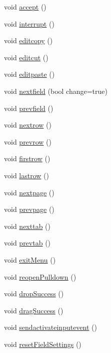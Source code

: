 \begin{DoxyCompactItemize}
\item 
void \hyperlink{classFglForm_a2300cda82ffb223096c19f63004e248f}{accept} ()
\item 
void \hyperlink{classFglForm_a0e2bda025291fc5a29a74254418cffdb}{interrupt} ()
\item 
void \hyperlink{classFglForm_ac51ab1764a0c88802875af3b0ef890af}{editcopy} ()
\item 
void \hyperlink{classFglForm_acba6e2dba68f2d8c8354a1f3e7de0213}{editcut} ()
\item 
void \hyperlink{classFglForm_a3bbc33d5de6401f21553a0e09e091292}{editpaste} ()
\item 
void \hyperlink{classFglForm_a1a279ed4bf3d729f30a346e8e6c9b8c7}{nextfield} (bool change=true)
\item 
void \hyperlink{classFglForm_a1a8413bf151ffd1e9fb4b0ae2a78dd6e}{prevfield} ()
\item 
void \hyperlink{classFglForm_a0321ef0bb745923607aecc90ff23dc16}{nextrow} ()
\item 
void \hyperlink{classFglForm_a92a335499ab7c95fa5b106f7a9f21e33}{prevrow} ()
\item 
void \hyperlink{classFglForm_af18f12d697d5a9fa0041c597d692d8f1}{firstrow} ()
\item 
void \hyperlink{classFglForm_adbc1aae701b9f9be093df1b60072ed10}{lastrow} ()
\item 
void \hyperlink{classFglForm_aafc9f7cacb9852d58b809a840abc104e}{nextpage} ()
\item 
void \hyperlink{classFglForm_ac3cf8e2f5bfc433cb19497e6bad4db0d}{prevpage} ()
\item 
void \hyperlink{classFglForm_a3f1ae54d6ef1585a6f14cf394758c09b}{nexttab} ()
\item 
void \hyperlink{classFglForm_a9eefd50c2b2dbcd9303a20a02a2ad140}{prevtab} ()
\item 
void \hyperlink{classFglForm_ac9689ad22eff52db3ab60446b78274e3}{exitMenu} ()
\item 
void \hyperlink{classFglForm_a267469fbb08f5d257f162df03b88852a}{reopenPulldown} ()
\item 
void \hyperlink{classFglForm_a0ccb7e3f717496c6dceaf34b0a6d49df}{dropSuccess} ()
\item 
void \hyperlink{classFglForm_a2a05aab413be356d8591d9feaa3818ea}{dragSuccess} ()
\item 
void \hyperlink{classFglForm_a6c13e4f1841a38f5cbf615595f88f78f}{sendactivateinputevent} ()
\item 
void \hyperlink{classFglForm_a1d7dad289a4b04321a2c932adf12d19b}{resetFieldSettings} ()

\end{DoxyCompactItemize}
